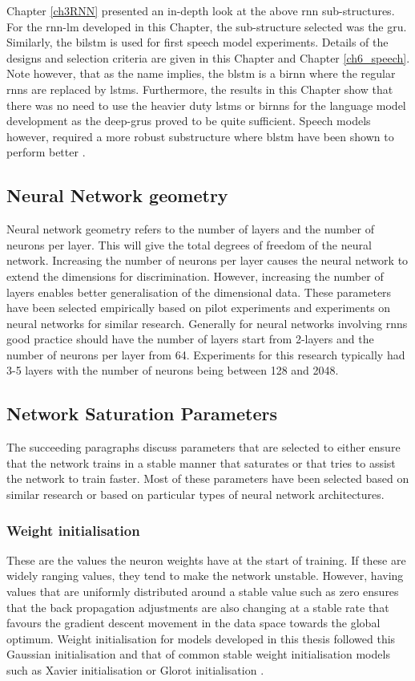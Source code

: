 Chapter \ref{ch3RNN} presented an in-depth look at the above \acrshort{rnn} sub-structures.  For the \acrshort{rnn}-\acrshort{lm} developed in this Chapter, the sub-structure selected was the \acrshort{gru}. Similarly, the \acrshort{bilstm} is used for first speech model experiments. Details of the designs and selection criteria are given in this Chapter and Chapter \ref{ch6_speech}.  Note however, that as the name implies, the \acrfull{blstm} is a \acrshort{birnn} where the regular \acrshort{rnn}s are replaced by \acrshort{lstm}s.  Furthermore, the results in this Chapter show that there was no need to use the heavier duty \acrshort{lstm}s or \acrshort{birnn}s for the language model development  as the deep-\acrshort{gru}s proved to be quite sufficient. Speech models however, required a more robust substructure where \acrshort{blstm} have been shown to perform better \citep{kim2017joint}.

\subsection{Neural Network geometry}
Neural network geometry refers to the number of layers and the number of neurons per layer. This will give the total degrees of freedom of the neural network.  Increasing the number of neurons per layer causes the neural network to extend the dimensions for discrimination.  However, increasing the number of layers enables better generalisation of the dimensional data.  These parameters have been selected empirically based on pilot experiments and experiments on neural networks for similar research. Generally for neural networks involving \acrshort{rnn}s good practice should have the number of layers start from 2-layers and the number of neurons per layer from 64.  Experiments for this research typically had 3-5 layers with the number of neurons being between 128 and 2048.

\subsection{Network Saturation Parameters}
The succeeding paragraphs discuss parameters that are selected to either ensure that the network trains in a stable manner that saturates or that tries to assist the network to train faster.  Most of these parameters have been selected based on similar research or based on particular types of neural network architectures.
\subsubsection{Weight initialisation} 
These are the values the neuron weights have at the start of training.  If these are  widely ranging values, they tend to make the network unstable.  However, having values that are uniformly distributed around a stable value such as zero ensures that the back propagation adjustments are also changing at a stable rate that favours the gradient descent movement in the data space towards the global optimum. Weight initialisation for models developed in this thesis followed this Gaussian initialisation and that of common stable weight initialisation models such as Xavier initialisation \citep{kumar2017weight} or Glorot initialisation \citep{glorot2010understanding} .
